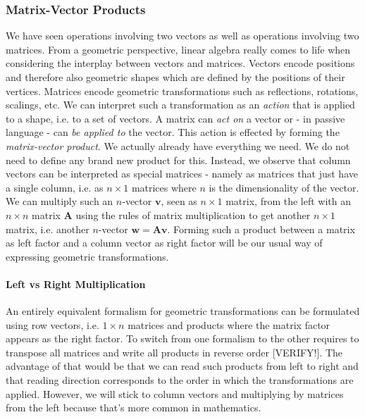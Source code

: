 

\subsubsection{Matrix-Vector Products}
We have seen operations involving two vectors as well as operations involving two matrices. From a geometric perspective, linear algebra really comes to life when considering the interplay between vectors and matrices. Vectors encode positions and therefore also geometric shapes which are defined by the positions of their vertices. Matrices encode geometric transformations such as reflections, rotations, scalings, etc. We can interpret such a transformation as an \emph{action} that is applied to a shape, i.e. to a set of vectors. A matrix can \emph{act on} a vector or - in passive language - can \emph{be applied to} the vector. This action is effected by forming the \emph{matrix-vector product}. We actually already have everything we need. We do not need to define any brand new product for this. Instead, we observe that column vectors can be interpreted as special matrices - namely as matrices that just have a single column, i.e. as $n \times 1$ matrices where $n$ is the dimensionality of the vector. We can multiply such an $n$-vector $\mathbf{v}$, seen as $n \times 1$ matrix, from the left with an $n \times n$ matrix  $\mathbf{A}$ using the rules of matrix multiplication to get another $n \times 1$ matrix, i.e. another $n$-vector $\mathbf{w} = \mathbf{A v}$. Forming such a product between a matrix as left factor and a column vector as right factor will be our usual way of expressing geometric transformations. 

\paragraph{Left vs Right Multiplication}
An entirely equivalent formalism for geometric transformations can be formulated using row vectors, i.e. $1 \times n$ matrices and products where the matrix factor appears as the right factor. To switch from one formalism to the other requires to transpose all matrices and write all products in reverse order [VERIFY!]. The advantage of that would be that we can read such products from left to right and that reading direction corresponds to the order in which the transformations are applied. However, we will stick to column vectors and multiplying by matrices from the left because that's more common in mathematics. 

